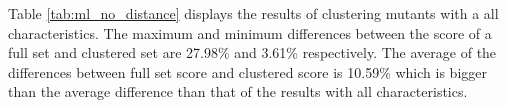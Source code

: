 \documentclass[../../main]{subfiles}
\begin{document}
\FloatBarrier
Table \ref{tab:ml_no_distance} displays the results of clustering mutants with a all characteristics.
The maximum and minimum differences between the score of a full set and clustered set are 27.98\% and 3.61\% respectively.
The average of the differences between full set score and clustered score is 10.59\% which is bigger than the average difference than that of the results with all characteristics.
\end{document}
